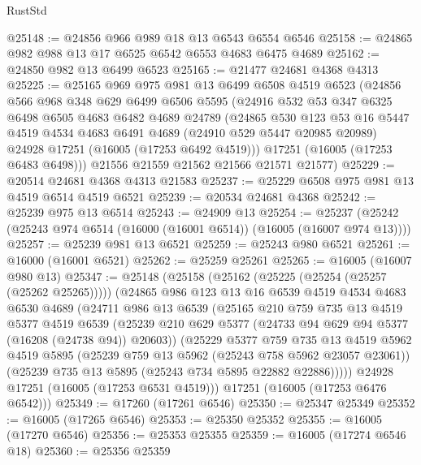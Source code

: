 \begin{lexlean}{RustStd}
\begin{coremodule}
@25148 := @24856 @966 @989 @18 @13 @6543 @6554 @6546
@25158 := @24865 @982 @988 @13 @17 @6525 @6542 @6553 @4683 @6475 @4689
@25162 := @24850 @982 @13 @6499 @6523
@25165 := @21477 @24681 @4368 @4313
@25225 := @25165
    @969
    @975
    @981
    @13
    @6499
    @6508
    @4519
    @6523
    (@24856
      @566
      @968
      @348
      @629
      @6499
      @6506
      @5595
      (@24916
        @532
        @53
        @347
        @6325
        @6498
        @6505
        @4683
        @6482
        @4689
        @24789
        (@24865
          @530
          @123
          @53
          @16
          @5447
          @4519
          @4534
          @4683
          @6491
          @4689
          (@24910 @529 @5447 @20985 @20989)
          @24928
          @17251
          (@16005 (@17253 @6492 @4519)))
        @17251
        (@16005 (@17253 @6483 @6498)))
      @21556
      @21559
      @21562
      @21566
      @21571
      @21577)
@25229 := @20514 @24681 @4368 @4313 @21583
@25237 := @25229 @6508 @975 @981 @13 @4519 @6514 @4519 @6521
@25239 := @20534 @24681 @4368
@25242 := @25239 @975 @13 @6514
@25243 := @24909 @13
@25254 := @25237 (@25242 (@25243 @974 @6514 (@16000 (@16001 @6514)) (@16005 (@16007 @974 @13))))
@25257 := @25239 @981 @13 @6521
@25259 := @25243 @980 @6521
@25261 := @16000 (@16001 @6521)
@25262 := @25259 @25261
@25265 := @16005 (@16007 @980 @13)
@25347 := @25148
    (@25158
      (@25162 (@25225 (@25254 (@25257 (@25262 @25265)))))
      (@24865
        @986
        @123
        @13
        @16
        @6539
        @4519
        @4534
        @4683
        @6530
        @4689
        (@24711
          @986
          @13
          @6539
          (@25165
            @210
            @759
            @735
            @13
            @4519
            @5377
            @4519
            @6539
            (@25239 @210 @629 @5377 (@24733 @94 @629 @94 @5377 (@16208 (@24738 @94)) @20603))
            (@25229
              @5377
              @759
              @735
              @13
              @4519
              @5962
              @4519
              @5895
              (@25239 @759 @13 @5962 (@25243 @758 @5962 @23057 @23061))
              (@25239 @735 @13 @5895 (@25243 @734 @5895 @22882 @22886)))))
        @24928
        @17251
        (@16005 (@17253 @6531 @4519)))
      @17251
      (@16005 (@17253 @6476 @6542)))
@25349 := @17260 (@17261 @6546)
@25350 := @25347 @25349
@25352 := @16005 (@17265 @6546)
@25353 := @25350 @25352
@25355 := @16005 (@17270 @6546)
@25356 := @25353 @25355
@25359 := @16005 (@17274 @6546 @18)
@25360 := @25356 @25359

\end{coremodule}
\end{lexlean}
